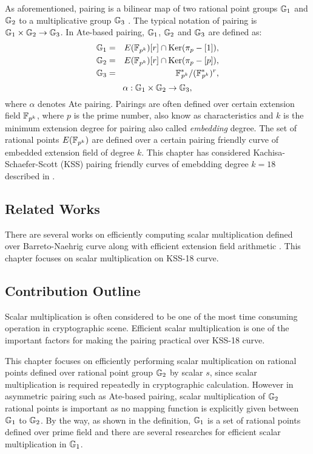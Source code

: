 As aforementioned, pairing is a bilinear map of two rational point groups ${\mathbb{G}}_{1}$ and ${\mathbb{G}}_{2}$ to a multiplicative group ${\mathbb{G}}_{3}$ \cite{Silverman}.
The typical notation of pairing is ${\mathbb{G}}_{1} \times {\mathbb{G}}_{2} \rightarrow {\mathbb{G}}_{3}$.
In  Ate-based pairing, ${\mathbb{G}}_{1}$, ${\mathbb{G}}_{2}$ and ${\mathbb{G}}_{3}$ are defined as:
\begin{eqnarray}\label{eqn_g1g2g3_group_kss18}
{\mathbb{G}}_{1} & = &  E({\mathbb{F}}_{p^{k}}) [r] \cap \text{Ker}(\pi_p - [1]), \nonumber \\
{\mathbb{G}}_{2} & = &  E({\mathbb{F}}_{p^{k}}) [r] \cap \text{Ker}(\pi_p - [p]), \nonumber \\
{\mathbb{G}}_{3} & = & {{\mathbb{F}}^{\ast}}_{\!\!\!p^{k}}/({{\mathbb{F}}^{\ast}}_{\!\!\!p^{k}})^r, \nonumber
\end{eqnarray}
\begin{equation}
\alpha : {\mathbb{G}}_{1} \times {\mathbb{G}}_{2} \rightarrow {\mathbb{G}}_{3},  \nonumber
\end{equation}
where $\alpha$ denotes Ate pairing.
Pairings are often defined over certain extension field $\mathbb{F}_{p^k}$, where $p$ is the prime number, also know as characteristics  and $k$  is the minimum extension degree for pairing also called \textit{embedding} degree. 
The set of rational points $E(\mathbb{F}_{p^k})$ are defined over a certain pairing friendly curve of embedded extension field of degree $k$.
This chapter has considered Kachisa-Schaefer-Scott (KSS) \cite{EPRINT:KacSchSco07} pairing friendly curves of emebdding degree $k=18$ described in \cite{EPRINT:FreScoTes06}.


\subsection{Related Works} 
There are several works \cite{DBLP:journals/ieicet/NogamiSONAM09}\cite{CANS:SNOKM08} on efficiently computing scalar multiplication defined over Barreto-Naehrig\cite{SAC:BarNae05} curve along with efficient extension field arithmetic \cite{C:BaiPaa98}. 
This chapter focuses on scalar multiplication on KSS-18 curve.

\subsection{Contribution Outline}
Scalar multiplication is often considered to be  one of the most time consuming operation in cryptographic scene. 
Efficient scalar multiplication is one of the important factors for making the pairing practical over KSS-18 curve.

This chapter focuses on efficiently performing scalar multiplication on rational points defined over rational point group ${\mathbb{G}}_{2}$ by scalar $s$, since scalar multiplication is required repeatedly in cryptographic calculation.
However in asymmetric pairing such as Ate-based pairing, scalar multiplication of ${\mathbb{G}}_{2}$ rational points is important as no mapping function is explicitly given between ${\mathbb{G}}_{1}$ to ${\mathbb{G}}_{2}$.
By the way, as shown in the definition, ${\mathbb{G}}_{1}$ is a set of rational points defined over prime field and there are several researches \cite{CANS:SNOKM08} for efficient scalar multiplication in ${\mathbb{G}}_{1}$.

